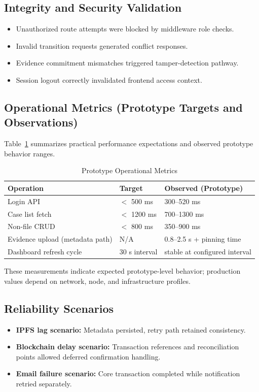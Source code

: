 \documentclass[conference]{IEEEtran}
\begin{document}
\subsection{Integrity and Security Validation}
\begin{itemize}
    \item Unauthorized route attempts were blocked by middleware role checks.
    \item Invalid transition requests generated conflict responses.
    \item Evidence commitment mismatches triggered tamper-detection pathway.
    \item Session logout correctly invalidated frontend access context.
\end{itemize}

\subsection{Operational Metrics (Prototype Targets and Observations)}
Table~\ref{tab:metrics} summarizes practical performance expectations and observed prototype behavior ranges.

\begin{table}[!t]
\caption{Prototype Operational Metrics}
\label{tab:metrics}
\centering
\begin{tabular}{p{2.6cm} p{1.7cm} p{1.9cm}}
\hline
\textbf{Operation} & \textbf{Target} & \textbf{Observed (Prototype)} \\
\hline
Login API & $<$ 500 ms & 300--520 ms \\
Case list fetch & $<$ 1200 ms & 700--1300 ms \\
Non-file CRUD & $<$ 800 ms & 350--900 ms \\
Evidence upload (metadata path) & N/A & 0.8--2.5 s + pinning time \\
Dashboard refresh cycle & 30 s interval & stable at configured interval \\
\hline
\end{tabular}
\end{table}

These measurements indicate expected prototype-level behavior; production values depend on network, node, and infrastructure profiles.

\subsection{Reliability Scenarios}
\begin{itemize}
    \item \textbf{IPFS lag scenario:} Metadata persisted, retry path retained consistency.
    \item \textbf{Blockchain delay scenario:} Transaction references and reconciliation points allowed deferred confirmation handling.
    \item \textbf{Email failure scenario:} Core transaction completed while notification retried separately.
\end{itemize}
\end{document}

